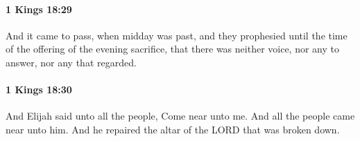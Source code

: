 		\paragraph{1 Kings 18:29} %
			\label{1KINGS-18-29}

			And it came to pass, when midday was past, and they prophesied until the time of the offering of the evening sacrifice, that there was neither voice, nor any to answer, nor any that regarded.


		\paragraph{1 Kings 18:30} %
			\label{1KINGS-18-30}

			And Elijah said unto all the people, Come near unto me. And all the people came near unto him. And he repaired the altar of the LORD that was broken down.


